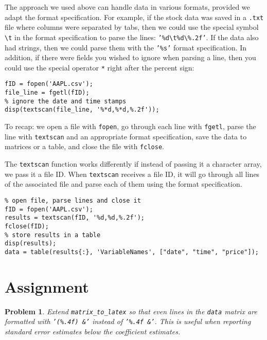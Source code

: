 \documentclass[12pt, a4paper]{article}
\newtheorem{problem}{Problem}
\begin{document}
The approach we used above can handle data in various formats, provided we adapt the format specification.
For example, if the stock data was saved in a \texttt{.txt} file where columns were separated by tabs, then we could use the special symbol \texttt{\textbackslash{}t} in the format specification to parse the lines: \texttt{'\%d\textbackslash{}t\%d\textbackslash{}\%.2f'}.
If the data also had strings, then we could parse them with the \texttt{'\%s'} format specification.
In addition, if there were fields you wished to ignore when parsing a line, then you could use the special operator \texttt{*} right after the percent sign:
\lstset{language=matlab,label= ,caption= ,captionpos=b,firstnumber=1,numbers=left,style=Matlab-editor}
\begin{lstlisting}
fID = fopen('AAPL.csv');
file_line = fgetl(fID);
% ignore the date and time stamps
disp(textscan(file_line, '%*d,%*d,%.2f'));
\end{lstlisting}

To recap: we open a file with \texttt{fopen}, go through each line with \texttt{fgetl}, parse the line with \texttt{textscan} and an appropriate format specification, save the data to matrices or a table, and close the file with \texttt{fclose}.

The \texttt{textscan} function works differently if instead of passing it a character array, we pass it a file ID.
When \texttt{textscan} receives a file ID, it will go through all lines of the associated file and parse each of them using the format specification.
\lstset{language=matlab,label= ,caption= ,captionpos=b,firstnumber=1,numbers=left,style=Matlab-editor}
\begin{lstlisting}
% open file, parse lines and close it
fID = fopen('AAPL.csv');
results = textscan(fID, '%d,%d,%.2f');
fclose(fID);
% store results in a table
disp(results);
data = table(results{:}, 'VariableNames', ["date", "time", "price"]);
\end{lstlisting}
\section{Assignment}
\label{sec:orga99aafe}
\begin{problem}
Extend \texttt{matrix\_to\_latex} so that even lines in the \texttt{data} matrix are formatted with \texttt{'(\%.4f) \&'} instead of \texttt{'\%.4f \&'}.
This is useful when reporting standard error estimates below the coefficient estimates.
\end{problem}
\end{document}
